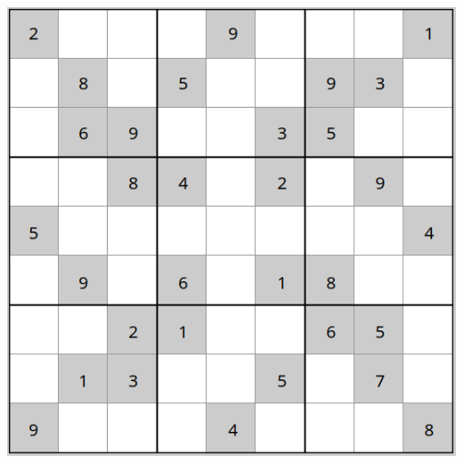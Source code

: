 \documentclass[a4paper]{article}
\begin{document}
\vspace{5mm}

\begin{center}
\includegraphics[width=.5\textwidth]{sudoku2}
\end{center}

\newpage






  
  
\end{document}
